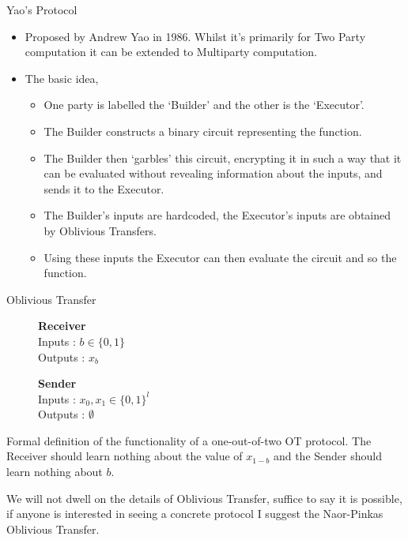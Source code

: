 \documentclass[t, 12pt]{beamer}            %
\begin{document}
\begin{frame}{Yao's Protocol}
	\begin{itemize} %
		\item Proposed by Andrew Yao in 1986. Whilst it's primarily for Two Party computation it can be extended to Multiparty computation.
		\item  The basic idea,
		\begin{itemize}
			\item One party is labelled the `Builder' and the other is the `Executor'.
			\item The Builder constructs a binary circuit representing the function.
			\item The Builder then `garbles' this circuit, encrypting it in such a way that it can be evaluated without revealing information about the inputs, and sends it to the Executor.
			\item The Builder's inputs are hardcoded, the Executor's inputs are obtained by Oblivious Transfers.
			\item Using these inputs the Executor can then evaluate the circuit and so the function.
		\end{itemize}
	\end{itemize}
\end{frame}


\begin{frame}
	\begin{block}{Oblivious Transfer}
		\vspace{0.2cm}
		\begin{figure}[!htb]
			\centering
			\begin{minipage}{0.45\textwidth}
				\centering
			\textbf{Receiver}\\
				Inputs : $b \in \{0, 1\}$\\
				Outputs : $x_b$\\
			\end{minipage}
			\begin{minipage}{0.45\textwidth}
				\centering
				\textbf{Sender}\\
				Inputs : $x_0, x_1 \in \{0, 1\}^l$\\
				Outputs : $\emptyset$\\
			\end{minipage}
		\end{figure}
	
		Formal definition of the functionality of a one-out-of-two OT protocol. The Receiver should learn nothing about the value of $x_{1-b}$ and the Sender should learn nothing about $b$.
	\end{block}
	
	We will not dwell on the details of Oblivious Transfer, suffice to say it is possible, if anyone is interested in seeing a concrete protocol I suggest the Naor-Pinkas Oblivious Transfer.
\end{frame}
\end{document}
